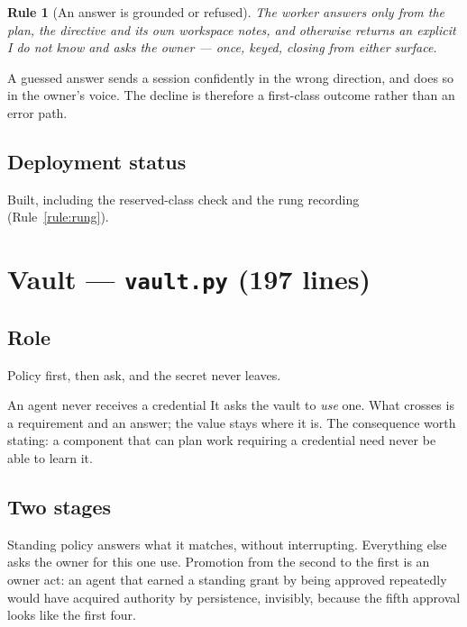 \documentclass[11pt]{article}
\newtheorem{drule}{Rule}
\newcommand{\code}[1]{\texttt{\small #1}}
\begin{document}
\begin{drule}[An answer is grounded or refused]
\label{rule:grounded}
The worker answers only from the plan, the directive and its own workspace notes, and otherwise returns an explicit \emph{I do not know} and asks the owner --- once, keyed, closing from either surface.
\end{drule}

A guessed answer sends a session confidently in the wrong direction, and does so in the owner's voice. The decline is therefore a first-class outcome rather than an error path.

\subsection{Deployment status}

Built, including the reserved-class check and the rung recording (Rule~\ref{rule:rung}).

\section{Vault --- \code{vault.py} (197 lines)}
\label{sec:vault}

\subsection{Role}

Policy first, then ask, and the secret never leaves.

\begin{secretbox}{An agent never receives a credential}
It asks the vault to \emph{use} one. What crosses is a requirement and an answer; the value stays where it is. The consequence worth stating: a component that can plan work requiring a credential need never be able to learn it.
\end{secretbox}

\subsection{Two stages}

Standing policy answers what it matches, without interrupting. Everything else asks the owner for this one use. Promotion from the second to the first is an owner act: an agent that earned a standing grant by being approved repeatedly would have acquired authority by persistence, invisibly, because the fifth approval looks like the first four.
\end{document}
